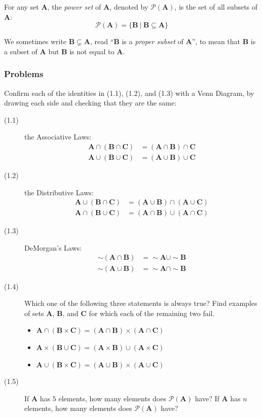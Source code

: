 \documentclass{article}
\newcommand{\Ps}{\mathcal P}
\newcommand{\A}{\mathbf A}
\newcommand{\B}{\mathbf B}
\newcommand{\C}{\mathbf C}
\begin{document}
For any set $\A$, the \emph{power set} of $\A$, denoted by $\Ps(\A)$, is the set of all subsets of $\A$:
\begin{equation*}
\Ps(\A) = \{ \B\ |\ \B \subseteq \A \}
\end{equation*}

We sometimes write $\B \subsetneq \A$, read ``$\B$ is a \emph{proper subset} of $\A$'', to mean that $\B$ is a subset of $\A$ but $\B$ is not equal to $\A$.

\subsubsection*{Problems}

Confirm each of the identities in (1.1), (1.2), and (1.3) with a Venn Diagram, by drawing each side and checking that they are the same:

\begin{description}
  \item[(1.1)] the Associative Laws:
    \begin{align*}
    \A \cap (\B \cap \C) & = (\A \cap \B) \cap \C \\
    \A \cup (\B \cup \C) & = (\A \cup \B) \cup \C
    \end{align*}
  \item[(1.2)] the Distributive Laws:
    \begin{align*}
    \A \cup (\B \cap \C) & = (\A \cup \B) \cap (\A \cup \C) \\
    \A \cap (\B \cup \C) & = (\A \cap \B) \cup (\A \cap \C)
    \end{align*}
  \item[(1.3)] DeMorgan's Laws:
    \begin{align*}
    \sim(\A \cap \B) & = \sim \A \cup \sim \B \\
    \sim(\A \cup \B) & = \sim \A \cap \sim \B
    \end{align*}
  \item[(1.4)] Which one of the following three statements is always true? Find examples of sets $\A$, $\B$, and $\C$ for which each of the remaining two fail.
    \begin{itemize}
      \item $\A \cap (\B \times \C) = (\A \cap \B) \times (\A \cap \C)$
      \item $\A \times (\B \cup \C) = (\A \times \B) \cup (\A \times \C)$
      \item $\A \cup (\B \times \C) = (\A \cup \B) \times (\A \cup \C)$
    \end{itemize}
  \item[(1.5)] If $\A$ has $5$ elements, how many elements does $\Ps(\A)$ have? If $\A$ has $n$ elements, how many elements does $\Ps(\A)$ have?
\end{description}
\end{document}
